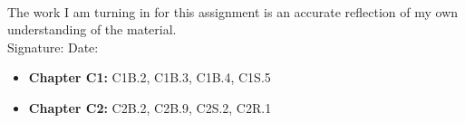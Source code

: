 \documentclass[12pt]{article}
\begin{document}
\\

\bigskip
\bigskip

\noindent The work I am turning in for this assignment is an accurate
reflection of my own understanding of the material.\\[14pt]

\noindent Signature: \underline{\hspace{7cm}} \hspace{1cm} Date:
\underline{\hspace{5cm}}\\



\hline 

\medskip
\begin{itemize}
\item {\bf Chapter C1:} C1B.2, C1B.3, C1B.4, C1S.5
\item {\bf Chapter C2:} C2B.2, C2B.9, C2S.2, C2R.1 
\end{itemize}
\end{document}
